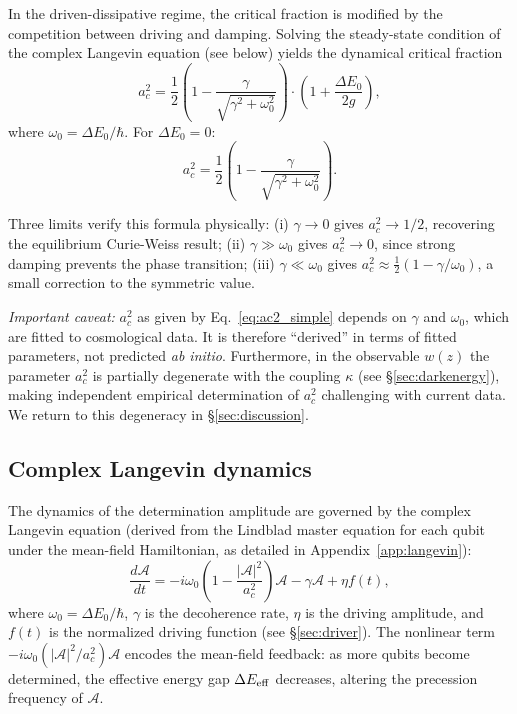 \documentclass[aps,prd,twocolumn,superscriptaddress]{revtex4-2}
\begin{document}
In the driven-dissipative regime, the critical fraction is modified by the competition between driving and damping. Solving the steady-state condition of the complex Langevin equation (see below) yields the dynamical critical fraction
\begin{equation}
\boxed{a_c^2 = \frac{1}{2}\left(1 - \frac{\gamma}{\sqrt{\gamma^2 + \omega_0^2}}\right) \cdot \left(1 + \frac{\Delta E_0}{2g}\right)},
\label{eq:ac2_dynamical}
\end{equation}
where $\omega_0 = \Delta E_0/\hbar$. For $\Delta E_0 = 0$:
\begin{equation}
a_c^2 = \frac{1}{2}\left(1 - \frac{\gamma}{\sqrt{\gamma^2 + \omega_0^2}}\right).
\label{eq:ac2_simple}
\end{equation}

Three limits verify this formula physically: (i) $\gamma \to 0$ gives $a_c^2 \to 1/2$, recovering the equilibrium Curie-Weiss result; (ii) $\gamma \gg \omega_0$ gives $a_c^2 \to 0$, since strong damping prevents the phase transition; (iii) $\gamma \ll \omega_0$ gives $a_c^2 \approx \frac{1}{2}(1 - \gamma/\omega_0)$, a small correction to the symmetric value.

\emph{Important caveat:} $a_c^2$ as given by Eq.~\eqref{eq:ac2_simple} depends on $\gamma$ and $\omega_0$, which are fitted to cosmological data. It is therefore ``derived'' in terms of fitted parameters, not predicted \emph{ab initio}. Furthermore, in the observable $w(z)$ the parameter $a_c^2$ is partially degenerate with the coupling $\kappa$ (see \S\ref{sec:darkenergy}), making independent empirical determination of $a_c^2$ challenging with current data. We return to this degeneracy in \S\ref{sec:discussion}.

\subsection{Complex Langevin dynamics}

The dynamics of the determination amplitude are governed by the complex Langevin equation (derived from the Lindblad master equation for each qubit under the mean-field Hamiltonian, as detailed in Appendix~\ref{app:langevin}):
\begin{equation}
\boxed{\frac{d\mathcal{A}}{dt} = -i\omega_0\left(1 - \frac{|\mathcal{A}|^2}{a_c^2}\right)\mathcal{A} - \gamma\mathcal{A} + \eta f(t)},
\label{eq:langevin}
\end{equation}
where $\omega_0 = \Delta E_0/\hbar$, $\gamma$ is the decoherence rate, $\eta$ is the driving amplitude, and $f(t)$ is the normalized driving function (see \S\ref{sec:driver}). The nonlinear term $-i\omega_0(|\mathcal{A}|^2/a_c^2)\mathcal{A}$ encodes the mean-field feedback: as more qubits become determined, the effective energy gap $\Delta E_{\rm eff}$ decreases, altering the precession frequency of $\mathcal{A}$.
\end{document}
